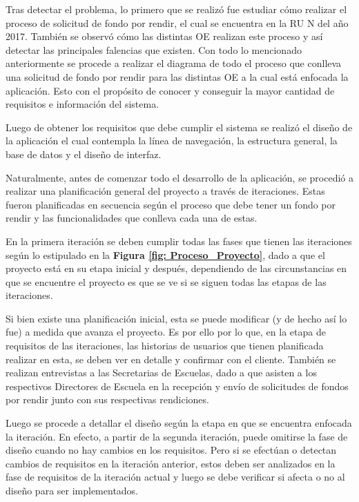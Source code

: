 Tras detectar el problema, lo primero que se realizó fue estudiar cómo realizar el proceso de solicitud de fondo por rendir, el cual se encuentra en la RU N del año 2017. También se observó cómo las distintas OE realizan este proceso y así detectar las principales falencias que existen. Con todo lo mencionado anteriormente se procede a realizar el diagrama de todo el proceso que conlleva una solicitud de fondo por rendir para las distintas OE a la cual está enfocada la aplicación. Esto con el propósito de conocer y conseguir la mayor cantidad de requisitos e información del sistema.

Luego de obtener los requisitos que debe cumplir el sistema se realizó el diseño de la aplicación el cual contempla la línea de navegación, la estructura general, la base de datos y el diseño de interfaz.

Naturalmente, antes de comenzar todo el desarrollo de la aplicación, se procedió a realizar una planificación general del proyecto a través de iteraciones. Estas fueron planificadas en secuencia según el proceso que debe tener un fondo por rendir y las funcionalidades que conlleva cada una de estas.

En la primera iteración se deben cumplir todas las fases que tienen las iteraciones según lo estipulado en la \textbf{Figura \ref{fig: Proceso_Proyecto}}, dado a que el proyecto está en su etapa inicial y después, dependiendo de las circunstancias en que se encuentre el proyecto es que se ve si se siguen todas las etapas de las iteraciones. 

Si bien existe una planificación inicial, esta se puede modificar (y de hecho así lo fue) a medida que avanza el proyecto. Es por ello por lo que, en la etapa de requisitos de las iteraciones, las historias de usuarios que tienen planificada realizar en esta, se deben ver en detalle y confirmar con el cliente. También se realizan entrevistas a las Secretarias de Escuelas, dado a que asisten a los respectivos Directores de Escuela en la recepción y envío de solicitudes de fondos por rendir junto con sus respectivas rendiciones.

Luego se procede a detallar el diseño según la etapa en que se encuentra enfocada la iteración. En efecto, a partir de la segunda iteración, puede omitirse la fase de diseño cuando no hay cambios en los requisitos. Pero si se efectúan o detectan cambios de requisitos en la iteración anterior, estos deben ser analizados en la fase de requisitos de la iteración actual y luego se debe verificar si afecta o no al diseño para ser implementados.


